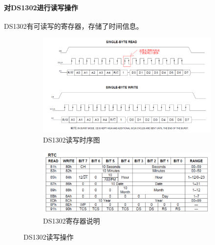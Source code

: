 \documentclass{article}
\begin{document}
\paragraph{对DS1302进行读写操作}DS1302有可读写的寄存器，存储了时间信息。
\begin{figure}[H]
    \begin{subfigure}{0.5\textwidth}
        \centering
        \includegraphics[width=0.99\linewidth]{assets/6.png}
        \caption{DS1302读写时序图}
    \end{subfigure}
    \begin{subfigure}{0.5\textwidth}
        \centering
        \includegraphics[width=0.99\linewidth]{assets/7.png}
        \caption{DS1302寄存器说明}
    \end{subfigure}
    \caption{DS1302读写操作}
\end{figure}
\end{document}
